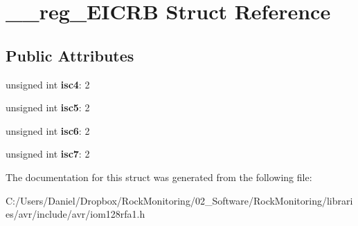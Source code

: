 \hypertarget{struct____reg___e_i_c_r_b}{}\section{\+\_\+\+\_\+reg\+\_\+\+E\+I\+C\+RB Struct Reference}
\label{struct____reg___e_i_c_r_b}
\subsection*{Public Attributes}
\begin{DoxyCompactItemize}
\item 
unsigned int {\bfseries isc4}\+: 2\hypertarget{struct____reg___e_i_c_r_b_aec7fdfd2ac44a985dd678974b812d03f}{}\label{struct____reg___e_i_c_r_b_aec7fdfd2ac44a985dd678974b812d03f}

\item 
unsigned int {\bfseries isc5}\+: 2\hypertarget{struct____reg___e_i_c_r_b_adf6ed4f18c91013765505101ee313a18}{}\label{struct____reg___e_i_c_r_b_adf6ed4f18c91013765505101ee313a18}

\item 
unsigned int {\bfseries isc6}\+: 2\hypertarget{struct____reg___e_i_c_r_b_a1ff9aa6701359339dd5299916ef70e30}{}\label{struct____reg___e_i_c_r_b_a1ff9aa6701359339dd5299916ef70e30}

\item 
unsigned int {\bfseries isc7}\+: 2\hypertarget{struct____reg___e_i_c_r_b_a730f623d1d9f8ac6a59737f2971eee1a}{}\label{struct____reg___e_i_c_r_b_a730f623d1d9f8ac6a59737f2971eee1a}

\end{DoxyCompactItemize}


The documentation for this struct was generated from the following file\+:\begin{DoxyCompactItemize}
\item 
C\+:/\+Users/\+Daniel/\+Dropbox/\+Rock\+Monitoring/02\+\_\+\+Software/\+Rock\+Monitoring/libraries/avr/include/avr/iom128rfa1.\+h\end{DoxyCompactItemize}
